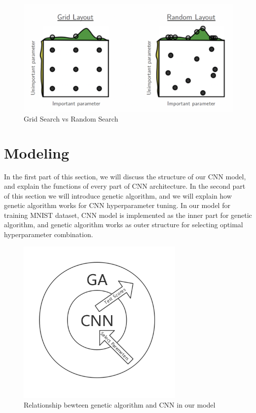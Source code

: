 \documentclass[12pt]{article}
\begin{document}
\begin{figure}\label{fig:pic1}
\begin{center}
\includegraphics[width = 5.5in]{grid_vs_random.png}
\caption{Grid Search vs Random Search}
\end{center}
\end{figure}



\section{Modeling}
In the first part of this section, we will discuss the structure of our CNN model, and explain the functions of every part of CNN architecture. In the second part of this section we will introduce genetic algorithm, and we will explain how genetic algorithm works for CNN hyperparameter tuning. In our model for training MNIST dataset, CNN model is implemented as the inner part for genetic algorithm, and genetic algorithm works as outer structure for selecting optimal hyperparameter combination.
\begin{figure}\label{fig:pic2}
\begin{center}
\includegraphics[width = 3.2in]{relationships.png}
\caption{Relationship bewteen genetic algorithm and CNN in our model}
\end{center}
\end{figure}
\end{document}
